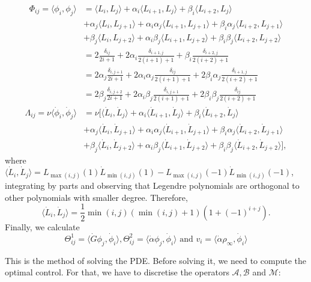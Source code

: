 \documentclass[12pt]{article}
\newcommand{\A}{\mathcal{A}}
\newcommand{\B}{\mathcal{B}}
\newcommand{\steady}{\rho_{\infty}}
\newcommand{\inner}[2]{\langle{} #1, #2 \rangle{}}
\theoremstyle{definition}
\begin{document}
\[
\begin{split}
    \Phi_{ij} = \inner{\phi_i}{\phi_j} &= \inner{L_i}{L_j} + \alpha_i\inner{L_{i+1}}{L_j} + \beta_i\inner{L_{i+2}}{L_j} \\
    &+ \alpha_j\inner{L_i}{L_{j+1}} + \alpha_i\alpha_j\inner{L_{i+1}}{L_{j+1}} + \beta_i\alpha_j\inner{L_{i+2}}{L_{j+1}} \\
    &+ \beta_j\inner{L_i}{L_{j+2}} + \alpha_i\beta_j\inner{L_{i+1}}{L_{j+2}} + \beta_i\beta_j\inner{L_{i+2}}{L_{j+2}} \\
    &= 2\frac{\delta_{ij}}{2i + 1} + 2\alpha_i\frac{\delta_{i+1,j}}{2(i+1) + 1} + \beta_i\frac{\delta_{i+2,j}}{2(i+2) + 1} \\
    &= 2\alpha_j\frac{\delta_{i,j+1}}{2i + 1} + 2\alpha_i\alpha_j\frac{\delta_{ij}}{2(i+1) + 1} + 2\beta_i\alpha_j\frac{\delta_{i+1,j}}{2(i+2) + 1} \\
    &= 2\beta_j\frac{\delta_{i,j+2}}{2i + 1} + 2\alpha_i\beta_j\frac{\delta_{i,j+1}}{2(i+1) + 1} + 2\beta_i\beta_j\frac{\delta_{ij}}{2(i+2) + 1}
\end{split}
\]
\[
\begin{split}
    \Lambda_{ij} = \nu\inner{\dot\phi_i}{\dot\phi_j} &= \nu[\inner{\dot L_i}{\dot L_j} + \alpha_i\inner{\dot L_{i+1}}{\dot L_j} + \beta_i\inner{\dot L_{i+2}}{\dot L_j} \\
    &+ \alpha_j\inner{\dot L_i}{\dot L_{j+1}} + \alpha_i\alpha_j\inner{\dot L_{i+1}}{\dot L_{j+1}} + \beta_i\alpha_j\inner{\dot L_{i+2}}{\dot L_{j+1}} \\
    &+ \beta_j\inner{\dot L_i}{\dot L_{j+2}} + \alpha_i\beta_j\inner{\dot L_{i+1}}{\dot L_{j+2}} + \beta_i\beta_j\inner{\dot L_{i+2}}{\dot L_{j+2}}],
\end{split}
\]
where $\inner{\dot L_i}{\dot L_j} = L_{\max(i,j)}(1) \dot L_{\min(i,j)}(1) - L_{\max(i,j)}(-1) \dot L_{\min(i,j)}(-1)$, integrating by parts and observing that Legendre polynomials are orthogonal to other polynomials with smaller degree.
Therefore, 
\[
\inner{\dot L_i}{\dot L_j} = \frac{1}{2} \min(i,j) (\min(i,j) + 1)\left(1 + {(-1)}^{i+j}\right).
\]
Finally, we calculate
\[
\Theta^1_{ij} = \inner{\dot{G} \phi_j}{\dot \phi_i}, \Theta^2_{ij} = \inner{\dot{\alpha} \phi_j}{\dot \phi_i} \text{ and } v_i = \inner{\dot\alpha \steady}{\dot\phi_i}    
\]

This is the method of solving the PDE.\@
Before solving it, we need to compute the optimal control.
For that, we have to discretise the operators $\A, \B$ and $\mathcal{M}$:
\end{document}
